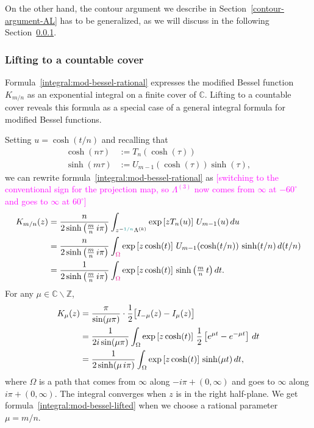 \documentclass{article}
\theoremstyle{definition}
\newcommand{\Z}{\mathbb{Z}}
\newcommand{\C}{\mathbb{C}}
\begin{document}
On the other hand, the contour argument we describe in Section~\ref{contour-argument-AL} has to be generalized, as we will discuss in the following Section~\ref{countable-cover}. 



\subsubsection{Lifting to a countable cover}\label{countable-cover}
Formula~\eqref{integral:mod-bessel-rational} expresses the modified Bessel function $K_{m/n}$ as an exponential integral on a finite cover of $\C$. Lifting to a countable cover reveals this formula as a special case of a general integral formula for modified Bessel functions.

Setting $u = \cosh(t/n)$ and recalling that
\begin{align*}
\cosh(n\tau) & := T_n(\cosh(\tau)) \\
\sinh(m\tau) & := U_{m-1}(\cosh(\tau)) \sinh(\tau),
\end{align*}
we can rewrite formula~\ref{integral:mod-bessel-rational} as \textcolor{magenta}{[switching to the conventional sign for the projection map, so $\Lambda^{(3)}$ now comes from $\infty$ at $-60^\circ$ and goes to $\infty$ at $60^\circ$]}
\begin{align}
\notag K_{m/n}(z) & = \frac{n}{2 \sinh\big(\tfrac{m}{n}\,i\pi\big)} \int_{z^{-\textcolor{DarkCyan}{1/n}}\Lambda^{(k)}} \exp\left[z T_n(u)\right]\,U_{m-1}(u)\,du \\
\notag & = \frac{n}{2 \sinh\big(\tfrac{m}{n}\,i\pi\big)} \int_{\textcolor{magenta}{\Omega}} \exp\left[z \cosh(t)\right]\,U_{m-1}(\cosh(t/n))\,\sinh(t/n)\,d(t/n) \\
\label{integral:mod-bessel-lifted} & = \frac{1}{2 \sinh\big(\tfrac{m}{n}\,i\pi\big)} \int_{\textcolor{magenta}{\Omega}} \exp\left[z \cosh(t)\right]\,\sinh\big(\tfrac{m}{n}\,t\big)\,dt.
\end{align}
For any $\mu \in \C \smallsetminus \Z$, 
\begin{align}
\notag K_\mu(z) & = \frac{\pi}{\sin(\mu \pi)} \cdot \frac{1}{2}\big[ I_{-\mu}(z) - I_\mu(z) \big] \\
\notag & = \frac{1}{2i \sin(\mu \pi)} \int_\Omega \exp\left[z \cosh(t)\right]\,\frac{1}{2}\left[e^{\mu t} - e^{-\mu t}\right]\,dt \\
\label{intgral:mod-bessel-general} & = \frac{1}{2 \sinh(\mu\,i\pi)} \int_\Omega \exp\left[z \cosh(t)\right]\,\sinh(\mu t)\,dt,
\end{align}
where $\Omega$ is a path that comes from $\infty$ along $-i \pi + (0, \infty)$ and goes to $\infty$ along $i \pi + (0, \infty)$. The integral converges when $z$ is in the right half-plane. We get formula~\eqref{integral:mod-bessel-lifted} when we choose a rational parameter $\mu = m/n$.
\end{document}
